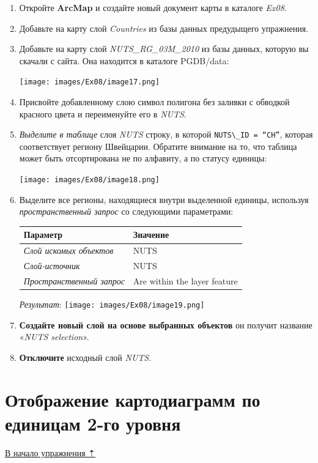 \documentclass[12pt,]{book}
\begin{document}
\begin{enumerate}
\def\labelenumi{\arabic{enumi}.}
\item
  Откройте \textbf{ArcMap} и создайте новый документ карты в каталоге \emph{Ex08}.
\item
  Добавьте на карту слой \emph{Countries} из базы данных предудыщего упражнения.
\item
  Добавьте на карту слой \emph{NUTS\_RG\_03M\_2010} из базы данных, которую вы скачали с сайта. Она находится в каталоге PGDB/data:

  \texttt{[image: images/Ex08/image17.png]}
\item
  Присвойте добавленному слою символ полигона без заливки с обводкой красного цвета и переименуйте его в \emph{NUTS}.
\item
  \emph{Выделите в таблице} слоя \emph{NUTS} строку, в которой \texttt{NUTS\textbackslash{}\_ID\ =\ “CH”}, которая соответствует региону Швейцарии. Обратите внимание на то, что таблица может быть отсортирована не по алфавиту, а по статусу единицы:

  \texttt{[image: images/Ex08/image18.png]}
\item
  Выделите все регионы, находящиеся внутри выделенной единицы, используя \emph{пространственный запрос} со следующими параметрами:

  \begin{longtable}[]{@{}ll@{}}
  \toprule
  Параметр & Значение\tabularnewline
  \midrule
  \endhead
  \emph{Слой искомых объектов} & NUTS\tabularnewline
  \emph{Слой-источник} & NUTS\tabularnewline
  \emph{Пространственный запрос} & Are within the layer feature\tabularnewline
  \bottomrule
  \end{longtable}

  \emph{Результат}:
  \texttt{[image: images/Ex08/image19.png]}
\item
  \textbf{Создайте новый слой на основе выбранных объектов} он получит название «\emph{NUTS selection}».
\item
  \textbf{Отключите} исходный слой \emph{NUTS}.
\end{enumerate}

\hypertarget{stat-map-economic-diagrams2}{%
\section{Отображение картодиаграмм по единицам 2-го уровня}\label{stat-map-economic-diagrams2}}

\protect\hyperlink{stat-map-economic}{В начало упражнения ⇡}
\end{document}
